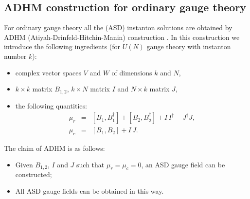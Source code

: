 \documentclass[a4paper,a4paper]{article}
\begin{document}
\subsection{ADHM construction for ordinary gauge theory}

For ordinary gauge theory all the (ASD) instanton solutions are obtained by
ADHM (Atiyah-Drinfeld-Hitchin-Manin) construction \cite{ADHM}. In this
construction we introduce the following ingredients (for $U(N)$ gauge theory
with instanton number $k$):

\begin{itemize}
\item complex vector spaces $V$ and $W$ of dimensions $k$ and $N$,

\item $k\times k$ matrix $B_{1,2}$, $k\times N$ matrix $I$ and $N\times k$
matrix $J$,

\item the following quantities:
\begin{eqnarray}
\mu _{r} &=&[B_{1},B_{1}^{\dagger }]+[B_{2},B_{2}^{\dagger }]+I\,I^{\dagger
}-J^{\dagger }J,  \label{ADHM1} \\
\mu _{c} &=&[B_{1},B_{2}]+I\,J.  \label{ADHM2}
\end{eqnarray}
\end{itemize}

The claim of ADHM is as follows:

\begin{itemize}
\item Given $B_{1,2}$, $I$ and $J$ such that $\mu_r=\mu_c=0$, an ASD gauge
field can be constructed;

\item All ASD gauge fields can be obtained in this way.
\end{itemize}
\end{document}

